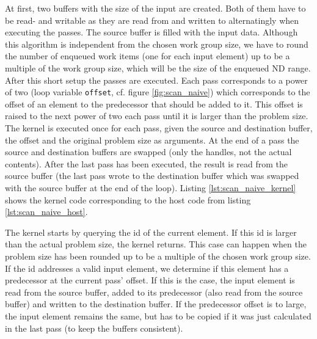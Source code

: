 At first, two buffers with the size of the input are created. Both of them have to be read- and writable as they are read from and written to alternatingly when executing the passes. The source buffer is filled with the input data. Although this algorithm is independent from the chosen work group size, we have to round the number of enqueued work items (one for each input element) up to be a multiple of the work group size, which will be the size of the enqueued ND range. After this short setup the passes are executed. Each pass corresponds to a power of two (loop variable \lstinline!offset!, cf. figure \ref{fig:scan_naive}) which corresponds to the offset of an element to the predecessor that should be added to it. This offset is raised to the next power of two each pass until it is larger than the problem size. The kernel is executed once for each pass, given the source and destination buffer, the offset and the original problem size as arguments. At the end of a pass the source and destination buffers are swapped (only the handles, not the actual contents). After the last pass has been executed, the result is read from the source buffer (the last pass wrote to the destination buffer which was swapped with the source buffer at the end of the loop).
Listing \ref{lst:scan_naive_kernel} shows the kernel code corresponding to the host code from listing \ref{lst:scan_naive_host}.



\pagebreak

The kernel starts by querying the id of the current element. If this id is larger than the actual problem size, the kernel returns. This case can happen when the problem size has been rounded up to be a multiple of the chosen work group size. If the id addresses a valid input element, we determine if this element has a predecessor at the current pass' offset. If this is the case, the input element is read from the source buffer, added to its predecessor (also read from the source buffer) and written to the destination buffer. If the predecessor offset is to large, the input element remains the same, but has to be copied if it was just calculated in the last pass (to keep the buffers consistent).

